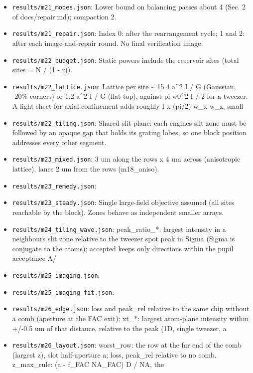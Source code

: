 \begin{itemize}
\item
  \texttt{results/m21\_modes.json}: Lower bound on balancing passes
  about 4 (Sec. 2 of docs/repair.md); compaction 2.
\item
  \texttt{results/m21\_repair.json}: Index 0: after the rearrangement
  cycle; 1 and 2: after each image-and-repair round. No final
  verification image.
\item
  \texttt{results/m22\_budget.json}: Static powers include the reservoir
  sites (total sites = N / (1 - r)).
\item
  \texttt{results/m22\_lattice.json}: Lattice per site \textasciitilde{}
  15.4 a\^{}2 I / G (Gaussian, -20\% corners) or 1.2 a\^{}2 I / G (flat
  top), against pi w0\^{}2 I / 2 for a tweezer. A light sheet for axial
  confinement adds roughly I x (pi/2) w\_x w\_z, small
\item
  \texttt{results/m22\_tiling.json}: Shared slit plane: each
  engine\textquotesingle s slit zone must be followed by an opaque gap
  that holds its grating lobes, so one block position addresses every
  other segment.
\item
  \texttt{results/m23\_mixed.json}: 3 um along the rows x 4 um across
  (anisotropic lattice), lanes 2 um from the rows (m18\_aniso).
\item
  \texttt{results/m23\_remedy.json}:
\item
  \texttt{results/m23\_steady.json}: Single large-field objective
  assumed (all sites reachable by the block). Zones behave as
  independent smaller arrays.
\item
  \texttt{results/m24\_tiling\_wave.json}: peak\_ratio\_*: largest
  intensity in a neighbour\textquotesingle s slit zone relative to the
  tweezer spot peak in Sigma (Sigma is conjugate to the atoms);
  \textquotesingle accepted\textquotesingle{} keeps only directions
  within the pupil acceptance A/
\item
  \texttt{results/m25\_imaging.json}:
\item
  \texttt{results/m25\_imaging\_fit.json}:
\item
  \texttt{results/m26\_edge.json}: loss and peak\_rel relative to the
  same chip without a comb (aperture at the FAC exit); xt\_*: largest
  atom-plane intensity within +/-0.5 um of that distance, relative to
  the peak (1D, single tweezer, a
\item
  \texttt{results/m26\_layout.json}: worst\_row: the row at the far end
  of the comb (largest z), slot half-aperture a; loss, peak\_rel
  relative to no comb. z\_max\_rule: (a - f\_FAC NA\_FAC) D / NA, the

\end{itemize}
